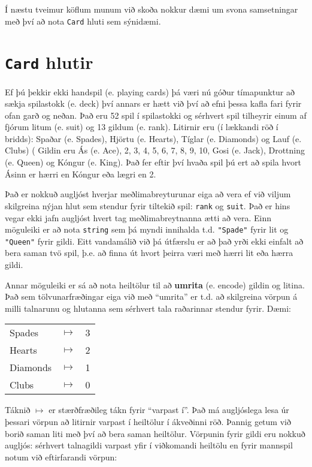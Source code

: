 Í næstu tveimur köflum munum við skoða nokkur dæmi um svona samsetningar með því að nota {\tt Card} hluti sem sýnidæmi. 

\section{{\tt Card} hlutir}

Ef þú þekkir ekki handspil (e. playing cards) þá væri nú góður tímapunktur að sækja spilastokk (e. deck) því annars er hætt við því að efni þessa kafla fari fyrir ofan garð og neðan.
Það eru 52 spil í spilastokki og sérhvert spil tilheyrir einum af fjórum litum (e. suit) og 13 gildum (e. rank).
Litirnir eru (í lækkandi röð í bridds): Spaðar (e. Spades), Hjörtu (e. Hearts), Tíglar (e. Diamonds) og Lauf (e. Clubs) (
Gildin eru Ás (e. Ace), 2, 3, 4, 5, 6, 7, 8, 9, 10, Gosi (e. Jack), Drottning (e. Queen) og Kóngur (e. King).
Það fer eftir því hvaða spil þú ert að spila hvort Ásinn er hærri en Kóngur eða lægri en 2.


Það er nokkuð augljóst hverjar meðlimabreyturunar eiga að vera ef við viljum skilgreina nýjan hlut sem stendur fyrir tiltekið spil: {\tt rank} og {\tt suit}.
Það er hins vegar ekki jafn augljóst hvert tag meðlimabreytnanna ætti að vera.
Einn möguleiki er að nota {\tt string} sem þá myndi innihalda t.d. \verb+"Spade"+ fyrir lit og \verb+"Queen"+ fyrir gildi.
Eitt vandamálið við þá útfærslu er að það yrði ekki einfalt að bera saman tvö spil, þ.e. að finna út hvort þeirra væri með hærri lit eða hærra gildi.


Annar möguleiki er sá að nota heiltölur til að {\bf umrita} (e. encode) gildin og litina. 
Það sem tölvunarfræðingar eiga við með ``umrita'' er t.d. að skilgreina vörpun á milli talnarunu og hlutanna sem sérhvert tala raðarinnar stendur fyrir.
Dæmi:

\vspace{0.1in}
\begin{tabular}{l c l}
Spades & $\mapsto$ & 3 \\
Hearts & $\mapsto$ & 2 \\
Diamonds & $\mapsto$ & 1 \\
Clubs & $\mapsto$ & 0
\end{tabular}
\vspace{0.1in}

Táknið $\mapsto$ er stærðfræðileg tákn fyrir ``varpast í''. 
Það má augljóslega lesa úr þessari vörpun að litirnir varpast í heiltölur í ákveðinni röð.
Þannig getum við borið saman liti með því að bera saman heiltölur.
Vörpunin fyrir gildi eru nokkuð augljós: sérhvert talnagildi varpast yfir í viðkomandi heiltölu en fyrir mannspil notum við eftirfarandi vörpun:

